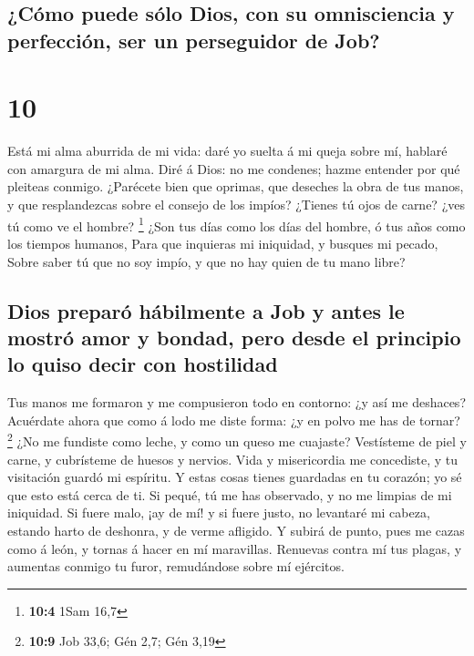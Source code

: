 \hypertarget{cuxf3mo-puede-suxf3lo-dios-con-su-omnisciencia-y-perfecciuxf3n-ser-un-perseguidor-de-job}{%
\subsection{¿Cómo puede sólo Dios, con su omnisciencia y perfección, ser
un perseguidor de
Job?}\label{cuxf3mo-puede-suxf3lo-dios-con-su-omnisciencia-y-perfecciuxf3n-ser-un-perseguidor-de-job}}

\hypertarget{section-9}{%
\section{10}\label{section-9}}

 Está mi alma aburrida de mi vida: daré yo suelta á mi
queja sobre mí, hablaré con amargura de mi alma.  Diré á
Dios: no me condenes; hazme entender por qué pleiteas conmigo.
 ¿Parécete bien que oprimas, que deseches la obra de tus
manos, y que resplandezcas sobre el consejo de los impíos?
 ¿Tienes tú ojos de carne? ¿ves tú como ve el hombre?
\footnote{\textbf{10:4} 1Sam 16,7}  ¿Son tus días como los
días del hombre, ó tus años como los tiempos humanos, 
Para que inquieras mi iniquidad, y busques mi pecado, 
Sobre saber tú que no soy impío, y que no hay quien de tu mano libre?

\hypertarget{dios-preparuxf3-huxe1bilmente-a-job-y-antes-le-mostruxf3-amor-y-bondad-pero-desde-el-principio-lo-quiso-decir-con-hostilidad}{%
\subsection{Dios preparó hábilmente a Job y antes le mostró amor y
bondad, pero desde el principio lo quiso decir con
hostilidad}\label{dios-preparuxf3-huxe1bilmente-a-job-y-antes-le-mostruxf3-amor-y-bondad-pero-desde-el-principio-lo-quiso-decir-con-hostilidad}}

 Tus manos me formaron y me compusieron todo en contorno:
¿y así me deshaces?  Acuérdate ahora que como á lodo me
diste forma: ¿y en polvo me has de tornar? \footnote{\textbf{10:9} Job
  33,6; Gén 2,7; Gén 3,19}  ¿No me fundiste como leche, y
como un queso me cuajaste?  Vestísteme de piel y carne, y
cubrísteme de huesos y nervios.  Vida y misericordia me
concediste, y tu visitación guardó mi espíritu.  Y estas
cosas tienes guardadas en tu corazón; yo sé que esto está cerca de ti.
 Si pequé, tú me has observado, y no me limpias de mi
iniquidad.  Si fuere malo, ¡ay de mí! y si fuere justo,
no levantaré mi cabeza, estando harto de deshonra, y de verme afligido.
 Y subirá de punto, pues me cazas como á león, y tornas á
hacer en mí maravillas.  Renuevas contra mí tus plagas, y
aumentas conmigo tu furor, remudándose sobre mí ejércitos.

